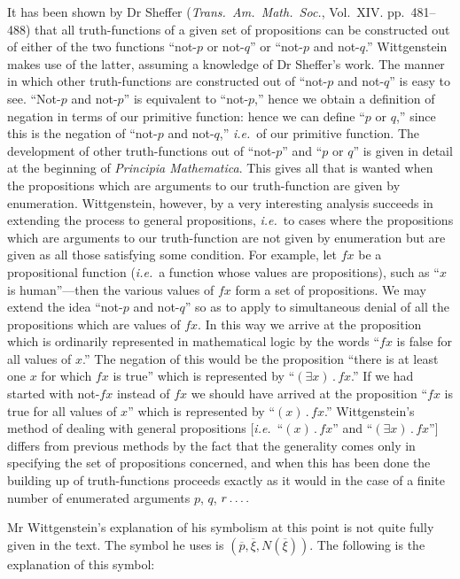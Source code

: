 \documentclass[12pt,oneside]{book}[2007/10/19]
\newcommand{\DPtypo}[2]{#2}
\newcommand{\DotOp}{\mathbin{.}}
\newcommand{\BookTitle}[1]{\emph{#1}}
\newcommand{\idEst}{\textit{i.e.}}
\newcommand{\fourdots}{\mathinner{\ldotp\ldotp\ldotp\ldotp}}
\begin{document}
It has been shown by Dr Sheffer (\BookTitle{Trans.\ Am.\ Math.\ Soc.},
Vol.~XIV. pp.~481--488) that all truth-functions of a given
set of propositions can be constructed out of either of
the two functions ``not-$p$ or not-$q$'' or ``not-$p$ and not-$q$.''
Wittgenstein makes use of the latter, assuming a knowledge
of Dr Sheffer's work. The manner in which other
truth-functions are constructed out of ``not-$p$ and not-$q$''
is easy to see. ``Not-$p$ and not-$p$'' is equivalent to
``not-$p$,'' hence we obtain a definition of negation in terms
of our primitive function: hence we can define ``$p$ or $q$,''
since this is the negation of ``not-$p$ and not-$q$,'' \idEst\ of
our primitive function. The development of other truth-functions
out of ``not-$p$'' and ``$p$ or $q$'' is given in detail
at the beginning of \BookTitle{Principia Mathematica}. This gives all
that is wanted when the propositions which are arguments
to our truth-function are given by enumeration. Wittgenstein,
however, by a very interesting analysis succeeds in
extending the process to general propositions, \idEst\ to cases
where the propositions which are arguments to our truth-function
are not given by enumeration but are given as
all those satisfying some condition. For example, let $fx$
be a propositional function (\idEst\ a function whose values
are propositions), such as ``$x$ is human''---then the various
values of $fx$ form a set of propositions. We may extend
the idea ``not-$p$ and not-$q$'' so as to apply to simultaneous
denial of all the propositions which are values of $fx$. In
this way we arrive at the proposition which is ordinarily
represented in mathematical logic by the words ``$fx$
is false for all values of $x$.'' The negation of this would
be the proposition ``there is at least one $x$ for which $fx$ is
true'' which is represented by ``$(\exists x) \DotOp fx$.'' If we had
started with not-$fx$ instead of $fx$ we should have arrived
at the proposition ``$fx$ is true for all values of $x$'' which
is represented by ``$(x) \DotOp fx$.'' Wittgenstein's method of
dealing with general propositions [\idEst\ ``$(x) \DotOp fx$'' and
``$(\exists x) \DotOp fx$''] differs from previous methods by the fact
that the generality comes only in specifying the set of
propositions concerned, and when this has been done the
building up of truth-functions proceeds exactly as it would
in the case of a finite number of enumerated arguments
\enlargethispage{9pt} %
$p$, $q$, $r\fourdots$

Mr Wittgenstein's explanation of his symbolism at
this point is not quite fully given in the text. The symbol
he uses is $(\overline{p}, \overline{\xi}, \DPtypo{\overline{N}}{N}(\overline{\xi}))$. The following is the explanation
of this symbol:
\end{document}
